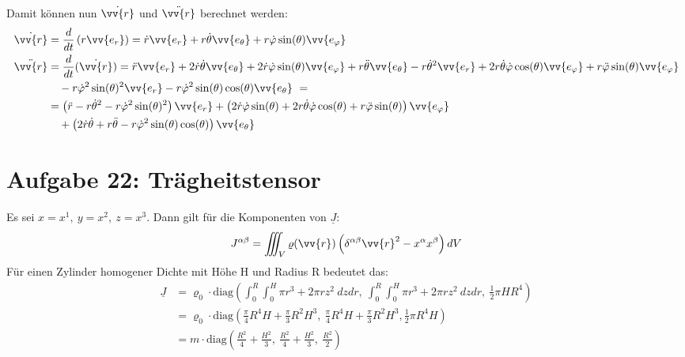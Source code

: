 \documentclass[a4paper,12pt]{article}
\begin{document}
Damit können nun $\dot{\vv{r}}$ und $\ddot{\vv{r}}$ berechnet werden:
\begin{align*}
\dot{\vv{r}}&=\frac{d}{dt}\left(r\vv{e_r}\right)=\dot{r}\vv{e_r}+r\dot{\theta}\vv{e_{\theta}} + r\dot{\varphi}\sin(\theta)\vv{e_{\varphi}}\\
\ddot{\vv{r}}&=\frac{d}{dt}(\dot{\vv{r}}) = \ddot{r}\vv{e_r}+2\dot{r}\dot{\theta}\vv{e_{\theta}} + 2\dot{r}\dot{\varphi}\sin(\theta)\vv{e_{\varphi}}+r\ddot{\theta}\vv{e_{\theta}}-r\dot{\theta}^2\vv{e_r}+2r\dot{\theta}\dot{\varphi}\cos(\theta)\vv{e_{\varphi}}+r\ddot{\varphi}\sin(\theta)\vv{e_{\varphi}}\\
&\ \ \ -r\dot{\varphi}^2\sin(\theta)^2\vv{e_r}-r\dot{\varphi}^2\sin(\theta)\cos(\theta)\vv{e_{\theta}}\ =\\
&= \left(\ddot{r}-r\dot{\theta}^2-r\dot{\varphi}^2\sin(\theta)^2\right)\vv{e_r}+\left(2\dot{r}\dot{\varphi}\sin(\theta)+2r\dot{\theta}\dot{\varphi}\cos(\theta)+r\ddot{\varphi}\sin(\theta)\right)\vv{e_{\varphi}}\\
&\ \ \ +\left(2\dot{r}\dot{\theta}+r\ddot{\theta}-r\dot{\varphi}^2\sin(\theta)\cos(\theta)\right)\vv{e_{\theta}}
\end{align*}
\section*{Aufgabe 22: Trägheitstensor}
Es sei $x=x^1,\ y=x^2,\ z=x^3$. Dann gilt für die Komponenten von $\underline{J}$:
\begin{align*}
J^{\alpha\beta}=\iiint_V \varrho(\vv{r})\left(\delta^{\alpha\beta}\vv{r}^2-x^{\alpha}x^{\beta}\right)dV
\end{align*}
Für einen Zylinder homogener Dichte mit Höhe H und Radius R bedeutet das:
\begin{align*}
\underline{J}&=\varrho_0 \cdot \mathrm{diag}\left(\int_0^R\int_0^H \pi r^3+2\pi rz^2\ dzdr,\ \int_0^R\int_0^H \pi r^3+2\pi rz^2\ dzdr,\ \frac12 \pi HR^4\right)\\
&=\varrho_0 \cdot\mathrm{diag}\left(\frac{\pi}{4}R^4H+\frac{\pi}{3}R^2H^3,\ \frac{\pi}{4}R^4H+\frac{\pi}{3}R^2H^3, \frac12 \pi R^4H\right)\\
&= m\cdot \mathrm{diag}\left(\frac{R^2}{4}+\frac{H^2}{3},\ \frac{R^2}{4}+\frac{H^2}{3},\ \frac{R^2}{2}\right)
\end{align*}
\end{document}
